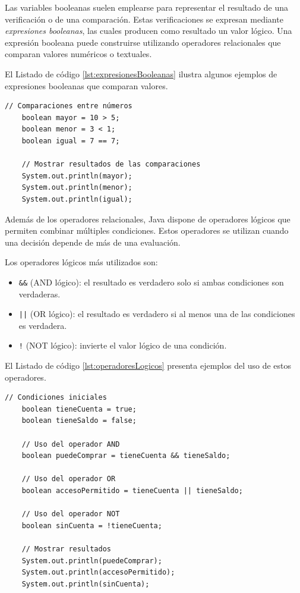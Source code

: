 \documentclass[12pt,twoside]{book}
\begin{document}
						\noindent
						Las variables booleanas suelen emplearse para representar el resultado de una verificación o de una comparación. Estas verificaciones se expresan mediante \textit{expresiones booleanas}, las cuales producen como resultado un valor lógico. Una expresión booleana puede construirse utilizando operadores relacionales que comparan valores numéricos o textuales.
						
						El Listado de código \ref{lst:expresionesBooleanas} ilustra algunos ejemplos de expresiones booleanas que comparan valores.
						
						\begin{lstlisting}[style=Java,caption={Ejemplos de expresiones booleanas.},label={lst:expresionesBooleanas}]
	// Comparaciones entre números
	boolean mayor = 10 > 5;
	boolean menor = 3 < 1;
	boolean igual = 7 == 7;
	
	// Mostrar resultados de las comparaciones
	System.out.println(mayor);
	System.out.println(menor);
	System.out.println(igual); \end{lstlisting}
						
						\noindent
						Además de los operadores relacionales, Java dispone de operadores lógicos que permiten combinar múltiples condiciones. Estos operadores se utilizan cuando una decisión depende de más de una evaluación.
						
						Los operadores lógicos más utilizados son:
						
						\begin{itemize}
							\item \texttt{\&\&} (AND lógico): el resultado es verdadero solo si ambas condiciones son verdaderas.
							\item \texttt{||} (OR lógico): el resultado es verdadero si al menos una de las condiciones es verdadera.
							\item \texttt{!} (NOT lógico): invierte el valor lógico de una condición.
						\end{itemize}
						
						\noindent
						El Listado de código \ref{lst:operadoresLogicos} presenta ejemplos del uso de estos operadores.
						
						\begin{lstlisting}[style=Java,caption={Uso de operadores lógicos.},label={lst:operadoresLogicos}]
	// Condiciones iniciales
	boolean tieneCuenta = true;
	boolean tieneSaldo = false;
	
	// Uso del operador AND
	boolean puedeComprar = tieneCuenta && tieneSaldo;
	
	// Uso del operador OR
	boolean accesoPermitido = tieneCuenta || tieneSaldo;
	
	// Uso del operador NOT
	boolean sinCuenta = !tieneCuenta;
	
	// Mostrar resultados
	System.out.println(puedeComprar);
	System.out.println(accesoPermitido);
	System.out.println(sinCuenta); \end{lstlisting}
						
\end{document}

